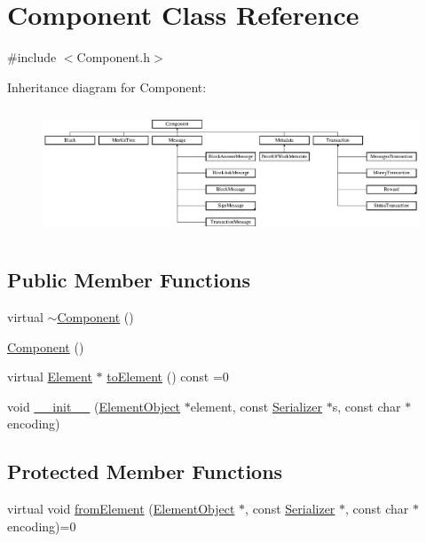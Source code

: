 \hypertarget{classComponent}{}\section{Component Class Reference}
\label{classComponent}


{\ttfamily \#include $<$Component.\+h$>$}

Inheritance diagram for Component\+:\begin{figure}[H]
\begin{center}
\leavevmode
\includegraphics[height=3.835616cm]{classComponent}
\end{center}
\end{figure}
\subsection*{Public Member Functions}
\begin{DoxyCompactItemize}
\item 
virtual \mbox{\hyperlink{classComponent_ab8378fa275af98e568a7e91d33d867af}{$\sim$\+Component}} ()
\item 
\mbox{\hyperlink{classComponent_a8775db6d1a2c1afc2e77cd3c8f39da6f}{Component}} ()
\item 
virtual \mbox{\hyperlink{classElement}{Element}} $\ast$ \mbox{\hyperlink{classComponent_a3e63d8c993e417a4af3f56d65ebfc7ea}{to\+Element}} () const =0
\item 
void \mbox{\hyperlink{classComponent_a28212595f8ee85fe009bd233bc99b2fc}{\+\_\+\+\_\+init\+\_\+\+\_\+}} (\mbox{\hyperlink{classElementObject}{Element\+Object}} $\ast$element, const \mbox{\hyperlink{classSerializer}{Serializer}} $\ast$s, const char $\ast$encoding)
\end{DoxyCompactItemize}
\subsection*{Protected Member Functions}
\begin{DoxyCompactItemize}
\item 
virtual void \mbox{\hyperlink{classComponent_a2ded18881226d0077dc393e0e9304bb1}{from\+Element}} (\mbox{\hyperlink{classElementObject}{Element\+Object}} $\ast$, const \mbox{\hyperlink{classSerializer}{Serializer}} $\ast$, const char $\ast$encoding)=0
\end{DoxyCompactItemize}


